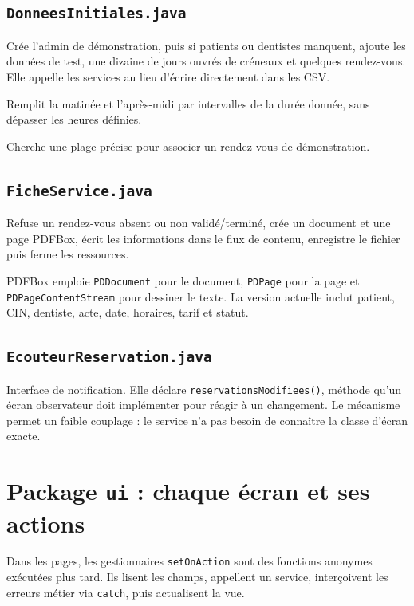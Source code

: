 \documentclass[11pt,a4paper]{report}
\begin{document}
\section{\texttt{DonneesInitiales.java}}
\begin{description}[leftmargin=4.7cm,style=nextline]
\item[\texttt{chargerSiBesoin()}] Crée l'admin de démonstration, puis si patients ou dentistes manquent, ajoute les données de test, une dizaine de jours ouvrés de créneaux et quelques rendez-vous. Elle appelle les services au lieu d'écrire directement dans les CSV.
\item[\texttt{creerJournee(dentiste, jour, duree)}] Remplit la matinée et l'après-midi par intervalles de la durée donnée, sans dépasser les heures définies.
\item[\texttt{trouverCreneau(dentiste, jour, heure)}] Cherche une plage précise pour associer un rendez-vous de démonstration.
\end{description}

\section{\texttt{FicheService.java}}
\begin{description}[leftmargin=4.7cm,style=nextline]
\item[\texttt{exporterPdf(rdv, destination)}] Refuse un rendez-vous absent ou non validé/terminé, crée un document et une page PDFBox, écrit les informations dans le flux de contenu, enregistre le fichier puis ferme les ressources.
\end{description}
PDFBox emploie \texttt{PDDocument} pour le document, \texttt{PDPage} pour la page et \texttt{PDPageContentStream} pour dessiner le texte. La version actuelle inclut patient, CIN, dentiste, acte, date, horaires, tarif et statut.

\section{\texttt{EcouteurReservation.java}}
Interface de notification. Elle déclare \texttt{reservationsModifiees()}, méthode qu'un écran observateur doit implémenter pour réagir à un changement. Le mécanisme permet un faible couplage : le service n'a pas besoin de connaître la classe d'écran exacte.

\chapter{Package \texttt{ui} : chaque écran et ses actions}
Dans les pages, les gestionnaires \texttt{setOnAction} sont des fonctions anonymes exécutées plus tard. Ils lisent les champs, appellent un service, interçoivent les erreurs métier via \texttt{catch}, puis actualisent la vue.
\end{document}
